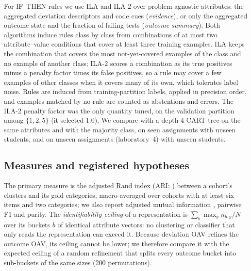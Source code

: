 \documentclass[a4paper,preprint,12pt,authoryear]{elsarticle}
\begin{document}
For IF--THEN rules we use ILA \citep{tolun1998ila} and ILA-2 \citep{tolun1999ila2} over problem-agnostic attributes: the aggregated deviation descriptors and code cues (\emph{evidence}), or only the aggregated outcome state and the fraction of failing tests (\emph{outcome summary}). Both algorithms induce rules class by class from combinations of at most two attribute--value conditions that cover at least three training examples. ILA keeps the combination that covers the most not-yet-covered examples of the class and no example of another class; ILA-2 scores a combination as its true positives minus a penalty factor times its false positives, so a rule may cover a few examples of other classes when it covers many of its own, which tolerates label noise. Rules are induced from training-partition labels, applied in precision order, and examples matched by no rule are counted as abstentions and errors. The ILA-2 penalty factor was the only quantity tuned, on the validation partition among $\{1,2,5\}$ (it selected 1.0). We compare with a depth-4 CART tree on the same attributes and with the majority class, on seen assignments with unseen students, and on unseen assignments (laboratory~4) with unseen students.

\subsection{Measures and registered hypotheses}\label{sec:hyp}
The primary measure is the adjusted Rand index (ARI; \citealt{hubert1985ari}) between a cohort's clusters and its gold categories, macro-averaged over cohorts with at least six items and two categories; we also report adjusted mutual information \citep{vinh2010ami}, pairwise F1 and purity. The \emph{identifiability ceiling} of a representation is $\sum_b \max_y n_{b,y}/N$ over its buckets $b$ of identical attribute vectors: no clustering or classifier that only reads the representation can exceed it. Because deviation OAV refines the outcome OAV, its ceiling cannot be lower; we therefore compare it with the expected ceiling of a random refinement that splits every outcome bucket into sub-buckets of the same sizes (200 permutations).
\end{document}
